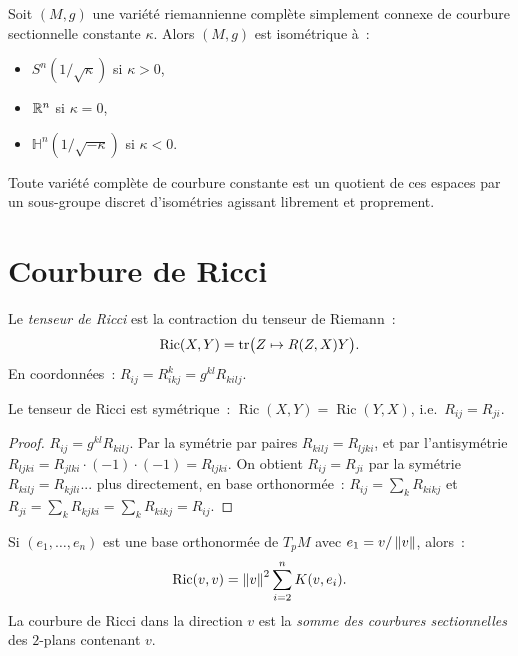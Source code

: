\begin{theoreme}
Soit $(M, g)$ une vari\'et\'e riemannienne compl\`ete simplement connexe de courbure
sectionnelle constante $\kappa$. Alors $(M, g)$ est isom\'etrique \`a~:
\begin{itemize}
    \item $S^n(1/\sqrt{\kappa})$ si $\kappa > 0$,
    \item $\mathbb{R}^n$ si $\kappa = 0$,
    \item $\mathbb{H}^n(1/\sqrt{-\kappa})$ si $\kappa < 0$.
\end{itemize}
Toute vari\'et\'e compl\`ete de courbure constante est un quotient de ces espaces par
un sous-groupe discret d'isom\'etries agissant librement et proprement.
\end{theoreme}

\section{Courbure de Ricci}

\begin{definition}
Le \emph{tenseur de Ricci} est la contraction du tenseur de Riemann~:
\[
    \operatorname{Ric}(X, Y) = \mathrm{tr}\big(Z \mapsto R(Z, X)Y\big).
\]
En coordonn\'ees~: $R_{ij} = R^k_{ikj} = g^{kl} R_{kilj}$.
\end{definition}

\begin{proposition}
Le tenseur de Ricci est sym\'etrique~: $\operatorname{Ric}(X,Y) = \operatorname{Ric}(Y,X)$,
i.e.\ $R_{ij} = R_{ji}$.
\end{proposition}

\begin{proof}
$R_{ij} = g^{kl}R_{kilj}$. Par la sym\'etrie par paires $R_{kilj} = R_{ljki}$,
et par l'antisym\'etrie $R_{ljki} = R_{jlki} \cdot (-1) \cdot (-1) = R_{ljki}$.
On obtient $R_{ij} = R_{ji}$ par la sym\'etrie $R_{kilj} = R_{kjli}$... plus
directement, en base orthonorm\'ee~:
$R_{ij} = \sum_k R_{kikj}$ et $R_{ji} = \sum_k R_{kjki} = \sum_k R_{kikj} = R_{ij}$.
\end{proof}

\begin{proposition}
Si $(e_1, \ldots, e_n)$ est une base orthonorm\'ee de $T_pM$ avec $e_1 = v/\left\| v \right\|$,
alors~:
\[
    \operatorname{Ric}(v, v) = \left\| v \right\|^2 \sum_{i=2}^n K(v, e_i).
\]
La courbure de Ricci dans la direction $v$ est la \emph{somme des courbures
sectionnelles} des $2$-plans contenant $v$.
\end{proposition}

